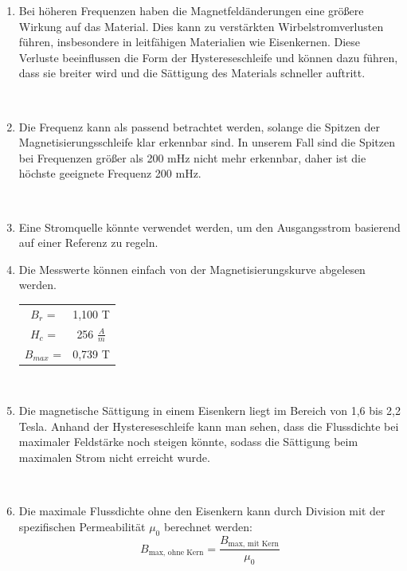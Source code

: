 \documentclass[a4paper,twoside,12pt,DIV=13,BCOR=5mm,numbers=noenddot,cleardoublepage=empty]{scrbook}
\begin{document}
\begin{enumerate}
            \item Bei höheren Frequenzen haben die Magnetfeldänderungen eine größere Wirkung auf das Material. Dies kann zu verstärkten Wirbelstromverlusten führen, insbesondere in leitfähigen Materialien wie Eisenkernen. Diese Verluste beeinflussen die Form der Hystereseschleife und können dazu führen, dass sie breiter wird und die Sättigung des Materials schneller auftritt.

            \\

            \item Die Frequenz kann als passend betrachtet werden, solange die Spitzen der Magnetisierungsschleife klar erkennbar sind. In unserem Fall sind die Spitzen bei Frequenzen größer als 200 mHz nicht mehr erkennbar, daher ist die höchste geeignete Frequenz 200 mHz.

            \\

            \item Eine Stromquelle könnte verwendet werden, um den Ausgangsstrom basierend auf einer Referenz zu regeln.             
            \\

            \item Die Messwerte können einfach von der Magnetisierungskurve abgelesen werden. \\
            \begin{tabular}{c c}
                $B_r$ =& 1,100 T  \\
                $H_c$ =& 256 $\frac{A}{m}$ \\
                $B_{max}$ =& 0,739 T
            \end{tabular}
            
            \\
            
            \item Die magnetische Sättigung in einem Eisenkern liegt im Bereich von 1,6 bis 2,2 Tesla. Anhand der Hystereseschleife kann man sehen, dass die Flussdichte bei maximaler Feldstärke noch steigen könnte, sodass die Sättigung beim maximalen Strom nicht erreicht wurde.

            \\
            
            \item Die maximale Flussdichte ohne den Eisenkern kann durch Division mit der spezifischen Permeabilität $\mu_0$ berechnet werden:
                \begin{equation}
                B_{\text{max, ohne Kern}} = \frac{B_{\text{max, mit Kern}}}{\mu_0}
                \end{equation}
    

\end{enumerate}
\end{document}
